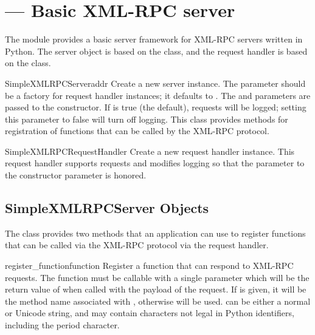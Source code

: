 \section{ ---
         Basic XML-RPC server}



The  module provides a basic server
framework for XML-RPC servers written in Python.  The server object is
based on the  class,
and the request handler is based on the
 class.


\begin{classdesc}{SimpleXMLRPCServer}{addr}
  Create a new server instance.  The  parameter
  should be a factory for request handler instances; it defaults to
  .  The  and
   parameters are passed to the
   constructor.  If
   is true (the default), requests will be logged;
  setting this parameter to false will turn off logging.  This class
  provides methods for registration of functions that can be called by
  the XML-RPC protocol.
\end{classdesc}


\begin{classdesc}{SimpleXMLRPCRequestHandler}{}
  Create a new request handler instance.  This request handler
  supports  requests and modifies logging so that the
   parameter to the 
  constructor parameter is honored.
\end{classdesc}


\subsection{SimpleXMLRPCServer Objects \label{simple-xmlrpc-servers}}

The  class provides two methods that an
application can use to register functions that can be called via the
XML-RPC protocol via the request handler.

\begin{methoddesc}[SimpleXMLRPCServer]{register_function}{function}
  Register a function that can respond to XML-RPC requests.  The
  function must be callable with a single parameter which will be the
  return value of  when called
  with the payload of the request.  If  is given, it will be
  the method name associated with , otherwise
   will be used.   can be
  either a normal or Unicode string, and may contain characters not
  legal in Python identifiers, including the period character.
\end{methoddesc}

